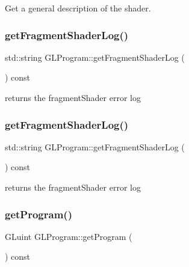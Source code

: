 Get a general description of the shader. \mbox{\label{classGLProgram_ac5715fdba2b5cde51888dba2faaa4ab8}} 
\subsubsection{\texorpdfstring{get\+Fragment\+Shader\+Log()}{getFragmentShaderLog()}\hspace{0.1cm}{\footnotesize\ttfamily [1/2]}}
{\footnotesize\ttfamily std\+::string G\+L\+Program\+::get\+Fragment\+Shader\+Log (\begin{DoxyParamCaption}{ }\end{DoxyParamCaption}) const}

returns the fragment\+Shader error log \mbox{\label{classGLProgram_ac5715fdba2b5cde51888dba2faaa4ab8}} 
\subsubsection{\texorpdfstring{get\+Fragment\+Shader\+Log()}{getFragmentShaderLog()}\hspace{0.1cm}{\footnotesize\ttfamily [2/2]}}
{\footnotesize\ttfamily std\+::string G\+L\+Program\+::get\+Fragment\+Shader\+Log (\begin{DoxyParamCaption}{ }\end{DoxyParamCaption}) const}

returns the fragment\+Shader error log \mbox{\label{classGLProgram_a02a4cfcbcf881d3f6c83dac6861e6743}} 
\subsubsection{\texorpdfstring{get\+Program()}{getProgram()}\hspace{0.1cm}{\footnotesize\ttfamily [1/2]}}
{\footnotesize\ttfamily G\+Luint G\+L\+Program\+::get\+Program (\begin{DoxyParamCaption}{ }\end{DoxyParamCaption}) const\hspace{0.3cm}{\ttfamily [inline]}}


